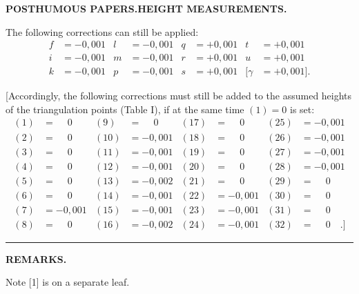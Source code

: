 \par\clearpage
\noindent{}\hfill{\small\textbf{POSTHUMOUS PAPERS.\quad HEIGHT MEASUREMENTS.}}\hfill\null\par\medskip
\par\noindent\hspace*{\parindent}The following corrections can still be applied:
\[
\begin{aligned}
f&=-0{,}001 & l&=-0{,}001 & q&=+0{,}001 & t&=+0{,}001\\
i&=-0{,}001 & m&=-0{,}001 & r&=+0{,}001 & u&=+0{,}001\\
k&=-0{,}001 & p&=-0{,}001 & s&=+0{,}001 & [\gamma&=+0{,}001].
\end{aligned}
\]
\par\noindent\hspace*{\parindent}[Accordingly, the following corrections must still be added to the assumed heights of the
triangulation points (Table I), if at the same time
\((1)=0\) is set:
\[
\begin{aligned}
(1)&=\phantom{-}0 & (9)&=\phantom{-}0 & (17)&=\phantom{-}0 & (25)&=-0{,}001\\
(2)&=\phantom{-}0 & (10)&=-0{,}001 & (18)&=\phantom{-}0 & (26)&=-0{,}001\\
(3)&=\phantom{-}0 & (11)&=-0{,}001 & (19)&=\phantom{-}0 & (27)&=-0{,}001\\
(4)&=\phantom{-}0 & (12)&=-0{,}001 & (20)&=\phantom{-}0 & (28)&=-0{,}001\\
(5)&=\phantom{-}0 & (13)&=-0{,}002 & (21)&=\phantom{-}0 & (29)&=\phantom{-}0\\
(6)&=\phantom{-}0 & (14)&=-0{,}001 & (22)&=-0{,}001 & (30)&=\phantom{-}0\\
(7)&=-0{,}001 & (15)&=-0{,}001 & (23)&=-0{,}001 & (31)&=\phantom{-}0\\
(8)&=\phantom{-}0 & (16)&=-0{,}002 & (24)&=-0{,}001 & (32)&=\phantom{-}0\quad.]
\end{aligned}
\]
\par\medskip
\begin{center}\rule{.18\linewidth}{.4pt}\end{center}
\par\bigskip
\begin{center}\small\textbf{REMARKS.}\end{center}
\begingroup
\footnotesize
\setlength{\abovedisplayskip}{5pt}\setlength{\belowdisplayskip}{5pt}
\par\noindent\hspace*{\parindent}Note [1] is on a separate leaf.
